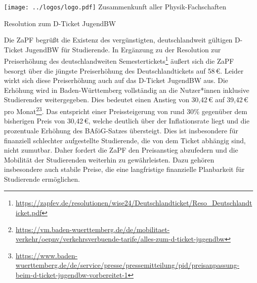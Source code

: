 \documentclass[DIV=calc]{scrartcl}
\begin{document}
\hspace{0.87\textwidth}
\begin{minipage}{120pt}
	\vspace{-1.8cm}
	\texttt{[image: ../logos/logo.pdf]}
	\centering
	\small Zusammenkunft aller Physik-Fachschaften
\end{minipage}

\begin{center}
  \huge{Resolution zum D-Ticket JugendBW}\vspace{.25\baselineskip}\\
  \normalsize
\end{center}
\vspace{1cm}





Die ZaPF begrüßt die Existenz des vergünstigten, deutschlandweit gültigen D-Ticket JugendBW für Studierende. In Ergänzung zu der Resolution zur Preiserhöhung des deutschlandweiten Semestertickets\footnote{\url{https://zapfev.de/resolutionen/wise24/Deutschlandticket/Reso_Deutschlandticket.pdf}} äußert sich die ZaPF besorgt über die jüngste Preiserhöhung des Deutschlandtickets auf 58\,€. Leider wirkt sich diese Preiserhöhung auch auf das D-Ticket JugendBW aus. Die Erhöhung wird in Baden-Württemberg vollständig an die Nutzer*innen inklusive Studierender weitergegeben. Dies bedeutet einen Anstieg von 30,42\,€ auf 39,42\,€ pro Monat\footnote{\url{https://vm.baden-wuerttemberg.de/de/mobilitaet-verkehr/oepnv/verkehrsverbuende-tarife/alles-zum-d-ticket-jugendbw}}\footnote{\url{https://www.baden-wuerttemberg.de/de/service/presse/pressemitteilung/pid/preisanpassung-beim-d-ticket-jugendbw-vorbereitet-1}}. Das entspricht einer Preissteigerung von rund 30\% gegenüber dem bisherigen Preis von 30,42\,€, welche deutlich über der Inflationsrate liegt und die prozentuale Erhöhung des BAföG-Satzes übersteigt. Dies ist insbesondere für finanziell schlechter aufgestellte Studierende, die von dem Ticket abhängig sind, nicht zumutbar. Daher fordert die ZaPF den Preisanstieg abzufedern und die Mobilität der Studierenden weiterhin zu gewährleisten. Dazu gehören insbesondere auch stabile Preise, die eine langfristige finanzielle Planbarkeit für Studierende ermöglichen.
\end{document}
